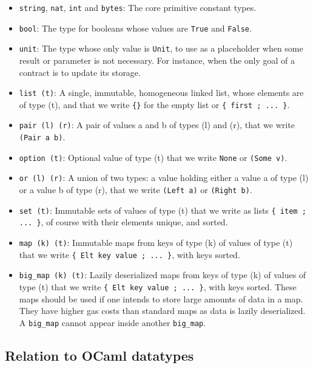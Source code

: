 \documentclass{article}
\begin{document}
\begin{itemize}
\item \texttt{string}, \texttt{nat}, \texttt{int} and \texttt{bytes}: The core primitive constant types.
\item 
  \texttt{bool}: The type for booleans whose values are \texttt{True} and \texttt{False}.
\item 
  \texttt{unit}: The type whose only value is \texttt{Unit}, to use as a placeholder
  when some result or parameter is not necessary. For instance, when
  the only goal of a contract is to update its storage.
\item 
  \texttt{list (t)}: A single, immutable, homogeneous linked list, whose
  elements are of type (t), and that we write \texttt{\{\}} for the empty list or
  \texttt{\{ first ; ... \}}. 
\item 
  \texttt{pair (l) (r)}: A pair of values a and b of types (l) and (r), that we
  write \texttt{(Pair a b)}.
\item 
  \texttt{option (t)}: Optional value of type (t) that we write \texttt{None} or \texttt{(Some
  v)}.
\item 
  \texttt{or (l) (r)}: A union of two types: a value holding either a value a
  of type (l) or a value b of type (r), that we write \texttt{(Left a)} or
  \texttt{(Right b)}.
\item 
  \texttt{set (t)}: Immutable sets of values of type (t) that we write as lists
  \texttt{\{ item ; ... \}}, of course with their elements unique, and sorted.
\item 
  \texttt{map (k) (t)}: Immutable maps from keys of type (k) of values of type
  (t) that we write \texttt{\{ Elt key value ; ... \}}, with keys sorted.
\item 
  \texttt{big\_map (k) (t)}: Lazily deserialized maps from keys of type (k) of
  values of type (t) that we write \texttt{\{ Elt key value ; ... \}}, with keys
  sorted. These maps should be used if one intends to store large
  amounts of data in a map. They have higher gas costs than standard
  maps as data is lazily deserialized. A \texttt{big\_map} cannot appear inside
  another \texttt{big\_map}.
\end{itemize}

\subsection{Relation to OCaml datatypes}
\label{sec:relat-ocaml-datatyp}
\end{document}
